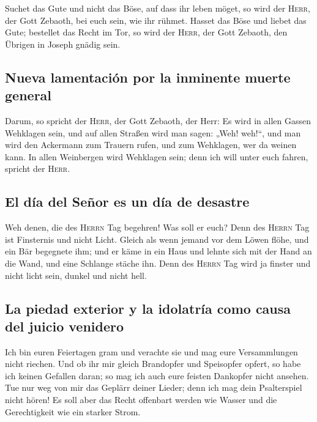  Suchet das Gute und nicht das Böse, auf dass ihr leben
möget, so wird der \textsc{Herr}, der Gott Zebaoth, bei euch sein, wie
ihr rühmet.  Hasset das Böse und liebet das Gute;
bestellet das Recht im Tor, so wird der \textsc{Herr}, der Gott Zebaoth,
den Übrigen in Joseph gnädig sein.

\hypertarget{nueva-lamentaciuxf3n-por-la-inminente-muerte-general}{%
\subsection{Nueva lamentación por la inminente muerte
general}\label{nueva-lamentaciuxf3n-por-la-inminente-muerte-general}}

 Darum, so spricht der \textsc{Herr}, der Gott Zebaoth,
der Herr: Es wird in allen Gassen Wehklagen sein, und auf allen Straßen
wird man sagen: „Weh! weh!{}``, und man wird den Ackermann zum Trauern
rufen, und zum Wehklagen, wer da weinen kann.  In allen
Weinbergen wird Wehklagen sein; denn ich will unter euch fahren, spricht
der \textsc{Herr}.

\hypertarget{el-duxeda-del-seuxf1or-es-un-duxeda-de-desastre}{%
\subsection{El día del Señor es un día de
desastre}\label{el-duxeda-del-seuxf1or-es-un-duxeda-de-desastre}}

 Weh denen, die des \textsc{Herrn} Tag begehren! Was soll
er euch? Denn des \textsc{Herrn} Tag ist Finsternis und nicht Licht.
 Gleich als wenn jemand vor dem Löwen flöhe, und ein Bär
begegnete ihm; und er käme in ein Haus und lehnte sich mit der Hand an
die Wand, und eine Schlange stäche ihn.  Denn des
\textsc{Herrn} Tag wird ja finster und nicht licht sein, dunkel und
nicht hell.

\hypertarget{la-piedad-exterior-y-la-idolatruxeda-como-causa-del-juicio-venidero}{%
\subsection{La piedad exterior y la idolatría como causa del juicio
venidero}\label{la-piedad-exterior-y-la-idolatruxeda-como-causa-del-juicio-venidero}}

 Ich bin euren Feiertagen gram und verachte sie und mag
eure Versammlungen nicht riechen.  Und ob ihr mir gleich
Brandopfer und Speisopfer opfert, so habe ich keinen Gefallen daran; so
mag ich auch eure feisten Dankopfer nicht ansehen.  Tue
nur weg von mir das Geplärr deiner Lieder; denn ich mag dein
Psalterspiel nicht hören!  Es soll aber das Recht
offenbart werden wie Wasser und die Gerechtigkeit wie ein starker Strom.

